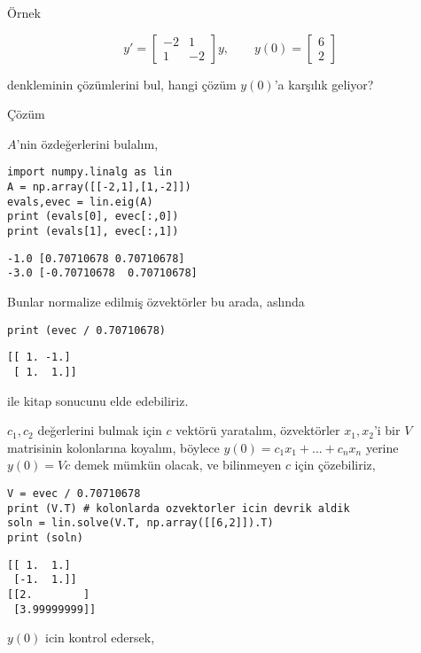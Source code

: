 \documentclass[12pt,fleqn]{article}\usepackage{../../common}
\begin{document}
Örnek

$$
y' = \left[\begin{array}{rrr}
-2 & 1 \\ 1 & -2
\end{array}\right]
y, \qquad
y(0) = \left[\begin{array}{c} 6 \\ 2 \end{array}\right]
$$

denkleminin çözümlerini bul, hangi çözüm $y(0)$'a karşılık geliyor?

Çözüm

$A$'nin özdeğerlerini bulalım,

\begin{verbatim}
import numpy.linalg as lin
A = np.array([[-2,1],[1,-2]])
evals,evec = lin.eig(A)
print (evals[0], evec[:,0])
print (evals[1], evec[:,1])
\end{verbatim}

\begin{verbatim}
-1.0 [0.70710678 0.70710678]
-3.0 [-0.70710678  0.70710678]
\end{verbatim}

Bunlar normalize edilmiş özvektörler bu arada, aslında

\begin{verbatim}
print (evec / 0.70710678)
\end{verbatim}

\begin{verbatim}
[[ 1. -1.]
 [ 1.  1.]]
\end{verbatim}

ile kitap sonucunu elde edebiliriz. 

$c_1,c_2$ değerlerini bulmak için $c$ vektörü yaratalım, özvektörler $x_1,x_2$'i
bir $V$ matrisinin kolonlarına koyalım, böylece $y(0) = c_1 x_1 + ... + c_n x_n$
yerine $y(0) = Vc$ demek mümkün olacak, ve bilinmeyen $c$ için çözebiliriz,

\begin{verbatim}
V = evec / 0.70710678 
print (V.T) # kolonlarda ozvektorler icin devrik aldik
soln = lin.solve(V.T, np.array([[6,2]]).T)
print (soln)
\end{verbatim}

\begin{verbatim}
[[ 1.  1.]
 [-1.  1.]]
[[2.        ]
 [3.99999999]]
\end{verbatim}

$y(0)$ icin kontrol edersek,
\end{document}
